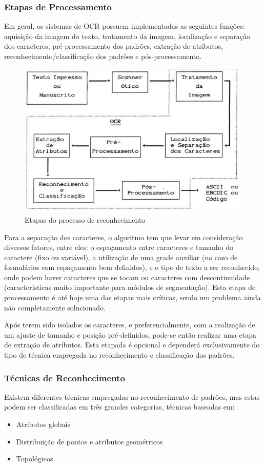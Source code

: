 		\subsubsection{Etapas de Processamento}
		Em geral, os sistemas de OCR possuem implementadas as seguintes funções: aquisição da imagem do texto, tratamento da imagem, localização e separação dos caracteres, pré-processamento dos padrões, extração de atributos, reconhecimento/classificação dos padrões e pós-processamento.
		
		\begin{figure}[!htb]
			\centering
			\includegraphics[scale=0.5]{img/etapas-de-processamento.jpg}
			\caption{Etapas do processo de reconhecimento}
			\label{Etapas do processo de reconhecimento}
		\end{figure}
		
		Para a separação dos caracteres, o algoritmo tem que levar em consideração diversos fatores, entre eles: o espaçamento entre caracteres e tamanho do caractere (fixo ou variável), a utilização de uma grade auxiliar (no caso de formulários com espaçamento bem definidos), e o tipo de texto a ser reconhecido, onde podem haver caracteres que se tocam ou caracteres com descontinuidade (características muito importante para módulos de segmentação). Esta etapa de processamento é até hoje uma das etapas mais críticas, sendo um problema ainda não completamente solucionado.
		
		Após terem sido isolados os caracteres, e preferencialmente, com a realização de um ajuste de tamanho e posição pré-definidos, pode-se então realizar uma etapa de extração de atributos. Esta etapada é opcional e dependerá exclusivamente do tipo de técnica empregada no reconhecimento e classificação dos padrões.
		
		\subsubsection{Técnicas de Reconhecimento}
		Existem diferentes técnicas empregadas no reconhecimento de padrões, mas estas podem ser classificadas em três grandes categorias, técnicas baseadas em:
		\begin{itemize}
			\item Atributos globais
			\item Distribuição de pontos e atributos geométricos
			\item Topológicos
		\end{itemize}